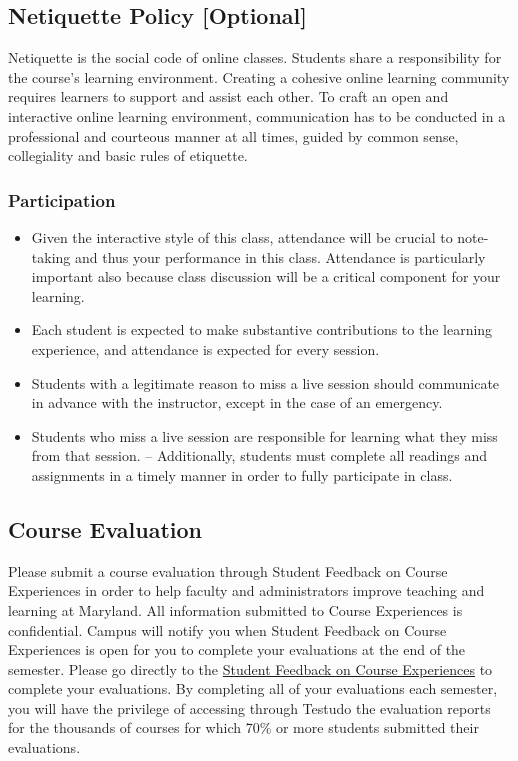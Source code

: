 \documentclass[11pt]{article}
\def\tightlist{}
\begin{document}
\hypertarget{netiquette-policy-optional}{%
\subsection{Netiquette Policy
{[}Optional{]}}\label{netiquette-policy-optional}}

Netiquette is the social code of online classes. Students share a
responsibility for the course's learning environment. Creating a
cohesive online learning community requires learners to support and
assist each other. To craft an open and interactive online learning
environment, communication has to be conducted in a professional and
courteous manner at all times, guided by common sense, collegiality and
basic rules of etiquette.

\hypertarget{participation}{%
\subsubsection{Participation}\label{participation}}

\begin{itemize}
\tightlist
\item
  Given the interactive style of this class, attendance will be crucial
  to note-taking and thus your performance in this class. Attendance is
  particularly important also because class discussion will be a
  critical component for your learning.
\item
  Each student is expected to make substantive contributions to the
  learning experience, and attendance is expected for every session.
\item
  Students with a legitimate reason to miss a live session should
  communicate in advance with the instructor, except in the case of an
  emergency.
\item
  Students who miss a live session are responsible for learning what
  they miss from that session. -- Additionally, students must complete
  all readings and assignments in a timely manner in order to fully
  participate in class.
\end{itemize}

\hypertarget{course-evaluation}{%
\subsection{Course Evaluation}\label{course-evaluation}}

Please submit a course evaluation through Student Feedback on Course
Experiences in order to help faculty and administrators improve teaching
and learning at Maryland. All information submitted to Course
Experiences is confidential. Campus will notify you when Student
Feedback on Course Experiences is open for you to complete your
evaluations at the end of the semester. Please go directly to the
\href{http://courseexp.umd.edu/}{Student Feedback on Course Experiences}
to complete your evaluations. By completing all of your evaluations each
semester, you will have the privilege of accessing through Testudo the
evaluation reports for the thousands of courses for which 70\% or more
students submitted their evaluations.
\end{document}

